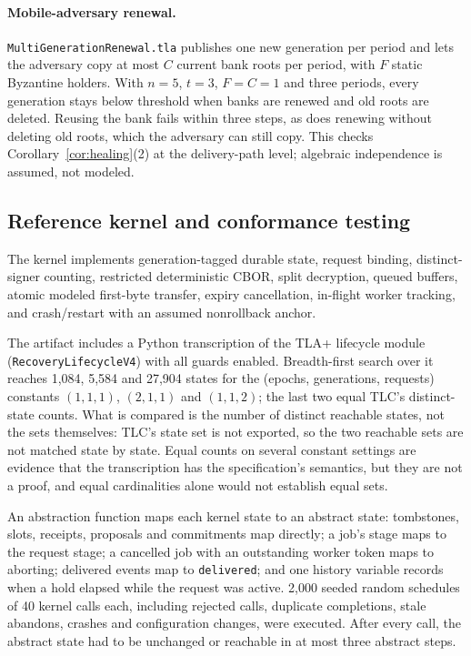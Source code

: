 \documentclass[pdflatex,sn-mathphys-num]{sn-jnl}%
\theoremstyle{plain}
\theoremstyle{definition}
\newcommand{\code}[1]{\texttt{#1}}
\begin{document}
\paragraph{Mobile-adversary renewal.}
\code{MultiGenerationRenewal.tla} publishes one new generation per period and lets the adversary copy at most $C$ current bank roots per period, with $F$ static Byzantine holders. With $n=5$, $t=3$, $F=C=1$ and three periods, every generation stays below threshold when banks are renewed and old roots are deleted. Reusing the bank fails within three steps, as does renewing without deleting old roots, which the adversary can still copy. This checks Corollary~\ref{cor:healing}(2) at the delivery-path level; algebraic independence is assumed, not modeled.

\subsection{Reference kernel and conformance testing}
The kernel implements generation-tagged durable state, request binding, distinct-signer counting, restricted deterministic CBOR, split decryption, queued buffers, atomic modeled first-byte transfer, expiry cancellation, in-flight worker tracking, and crash/restart with an assumed nonrollback anchor.

The artifact includes a Python transcription of the TLA+ lifecycle module (\code{RecoveryLifecycleV4}) with all guards enabled. Breadth-first search over it reaches 1,084, 5,584 and 27,904 states for the (epochs, generations, requests) constants $(1,1,1)$, $(2,1,1)$ and $(1,1,2)$; the last two equal TLC's distinct-state counts. What is compared is the number of distinct reachable states, not the sets themselves: TLC's state set is not exported, so the two reachable sets are not matched state by state. Equal counts on several constant settings are evidence that the transcription has the specification's semantics, but they are not a proof, and equal cardinalities alone would not establish equal sets.

An abstraction function maps each kernel state to an abstract state: tombstones, slots, receipts, proposals and commitments map directly; a job's stage maps to the request stage; a cancelled job with an outstanding worker token maps to aborting; delivered events map to \code{delivered}; and one history variable records when a hold elapsed while the request was active. 2,000 seeded random schedules of 40 kernel calls each, including rejected calls, duplicate completions, stale abandons, crashes and configuration changes, were executed. After every call, the abstract state had to be unchanged or reachable in at most three abstract steps.
\end{document}
